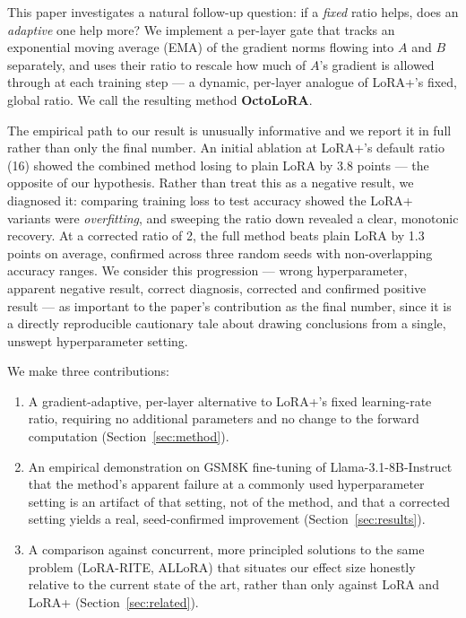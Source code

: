 \documentclass[11pt]{article}
\begin{document}
This paper investigates a natural follow-up question: if a \emph{fixed}
ratio helps, does an \emph{adaptive} one help more? We implement a
per-layer gate that tracks an exponential moving average (EMA) of the
gradient norms flowing into $A$ and $B$ separately, and uses their ratio
to rescale how much of $A$'s gradient is allowed through at each training
step — a dynamic, per-layer analogue of LoRA+'s fixed, global ratio. We
call the resulting method \textbf{OctoLoRA}.

The empirical path to our result is unusually informative and we report it
in full rather than only the final number. An initial ablation at LoRA+'s
default ratio (16) showed the combined method losing to plain LoRA by
3.8 points — the opposite of our hypothesis. Rather than treat this as a
negative result, we diagnosed it: comparing training loss to test accuracy
showed the LoRA+ variants were \emph{overfitting}, and sweeping the ratio
down revealed a clear, monotonic recovery. At a corrected ratio of 2, the
full method beats plain LoRA by 1.3 points on average, confirmed across
three random seeds with non-overlapping accuracy ranges. We consider this
progression — wrong hyperparameter, apparent negative result, correct
diagnosis, corrected and confirmed positive result — as important to the
paper's contribution as the final number, since it is a directly
reproducible cautionary tale about drawing conclusions from a single,
unswept hyperparameter setting.

We make three contributions:
\begin{enumerate}
  \item A gradient-adaptive, per-layer alternative to LoRA+'s fixed
  learning-rate ratio, requiring no additional parameters and no change to
  the forward computation (Section~\ref{sec:method}).
  \item An empirical demonstration on GSM8K fine-tuning of
  Llama-3.1-8B-Instruct that the method's apparent failure at a commonly
  used hyperparameter setting is an artifact of that setting, not of the
  method, and that a corrected setting yields a real, seed-confirmed
  improvement (Section~\ref{sec:results}).
  \item A comparison against concurrent, more principled solutions to the
  same problem (LoRA-RITE, ALLoRA) that situates our effect size honestly
  relative to the current state of the art, rather than only against LoRA
  and LoRA+ (Section~\ref{sec:related}).
\end{enumerate}
\end{document}
